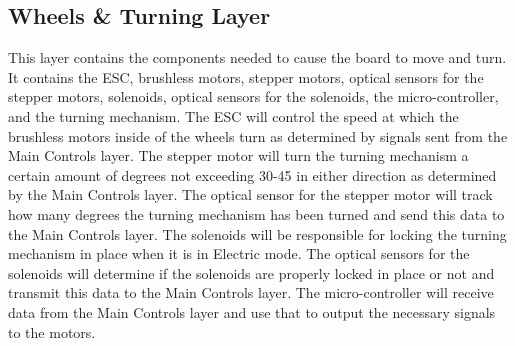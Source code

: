 \subsection{Wheels \& Turning Layer}
This layer contains the components needed to cause the board to move and turn. It contains the ESC, brushless motors, stepper motors, optical sensors for the stepper motors, solenoids, optical sensors for the solenoids, the micro-controller, and the turning mechanism. The ESC will control the speed at which the brushless motors inside of the wheels turn as determined by signals sent from the Main Controls layer. The stepper motor will turn the turning mechanism a certain amount of degrees not exceeding 30-45 in either direction as determined by the Main Controls layer. The optical sensor for the stepper motor will track how many degrees the turning mechanism has been turned and send this data to the Main Controls layer. The solenoids will be responsible for locking the turning mechanism in place when it is in Electric mode. The optical sensors for the solenoids will determine if the solenoids are properly locked in place or not and transmit this data to the Main Controls layer. The micro-controller will receive data from the Main Controls layer and use that to output the necessary signals to the motors. 

